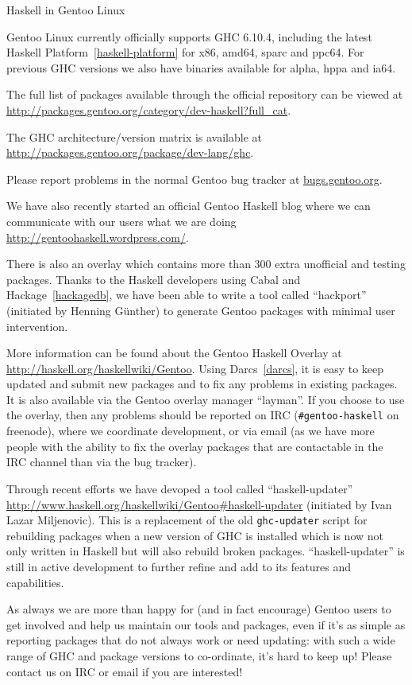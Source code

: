 \begin{hcarentry}[updated]{Haskell in Gentoo Linux}
\label{gentoo}
\makeheader

Gentoo Linux currently officially supports GHC 6.10.4, including the
latest Haskell Platform~\cref{haskell-platform} for x86, amd64, sparc
and ppc64.  For previous GHC versions we also have binaries available
for alpha, hppa and ia64.

The full list of packages available through the official repository
can be viewed at
\url{http://packages.gentoo.org/category/dev-haskell?full\_cat}.

The GHC architecture/version matrix is available at
\url{http://packages.gentoo.org/package/dev-lang/ghc}.

Please report problems in the normal Gentoo bug tracker
at \url{bugs.gentoo.org}.

We have also recently started an official Gentoo Haskell blog where we
can communicate with our users what we are doing
\url{http://gentoohaskell.wordpress.com/}.

There is also an overlay which contains more than 300 extra unofficial
and testing packages. Thanks to the Haskell developers using Cabal and
Hackage~\cref{hackagedb}, we have been able to write a tool called
``hackport'' (initiated by Henning G\"unther) to generate Gentoo
packages with minimal user intervention.

More information can be found about the Gentoo Haskell Overlay at
\url{http://haskell.org/haskellwiki/Gentoo}. Using Darcs~\cref{darcs},
it is easy to keep updated and submit new packages and to fix any
problems in existing packages.  It is also available via the Gentoo
overlay manager ``layman''.  If you choose to use the overlay, then
any problems should be reported on IRC (\verb+#gentoo-haskell+ on
freenode), where we coordinate development, or via email
 (as we have more people with the ability to
fix the overlay packages that are contactable in the IRC channel than
via the bug tracker).

Through recent efforts we have devoped a tool called
``haskell-updater''
\url{http://www.haskell.org/haskellwiki/Gentoo#haskell-updater}
(initiated by Ivan Lazar Miljenovic).  This is a replacement of the
old \verb+ghc-updater+ script for rebuilding packages when a new
version of GHC is installed which is now not only written in Haskell
but will also rebuild broken packages.  ``haskell-updater'' is still
in active development to further refine and add to its features and
capabilities.

As always we are more than happy for (and in fact encourage) Gentoo
users to get involved and help us maintain our tools and packages,
even if it's as simple as reporting packages that do not always work
or need updating: with such a wide range of GHC and package versions
to co-ordinate, it's hard to keep up!  Please contact us on IRC or
email if you are interested!
\end{hcarentry}
